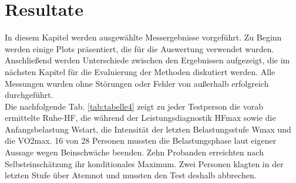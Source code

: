 \chapter{Resultate}
%
In diesem Kapitel werden ausgewählte Messergebnisse vorgeführt. Zu Beginn werden einige Plots präsentiert, die für die Auswertung verwendet wurden. Anschließend werden Unterschiede zwischen den Ergebnissen aufgezeigt, die im nächsten Kapitel für die Evaluierung der Methoden diskutiert werden. Alle Messungen wurden ohne Störungen oder Fehler von außerhalb erfolgreich durchgeführt.\\
Die nachfolgende Tab. \ref{tab:tabelle4} zeigt zu jeder Testperson die vorab ermittelte Ruhe-\acs{HF}, die während der Leistungsdiagnostik \ac{HFmax} sowie die Anfangsbelastung \acs{Wstart}, die Intensität der letzten Belastungsstufe \acs{Wmax} und die \ac{VO2max}. 16 von 28 Personen mussten die Belastungsphase laut eigener Aussage wegen Beinschwäche beenden. Zehn Probanden erreichten nach Selbsteinschätzung ihr konditionales Maximum. Zwei Personen klagten in der letzten Stufe über Atemnot und mussten den Test deshalb abbrechen.
%
